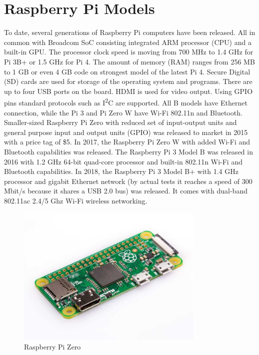 \documentclass[11pt]{article}
\begin{document}
\section{Raspberry Pi Models}
To date, several generations of Raspberry Pi computers have been released.
 All in common with Broadcom SoC consisting integrated ARM processor (CPU)
 and a built-in GPU. The processor clock speed is moving from 700 MHz to 1.4 GHz
 for Pi 3B+ or 1.5 GHz for Pi 4. The amount of memory (RAM) ranges from 256 MB
 to 1 GB or even 4 GB code on strongest model of the latest Pi 4. Secure Digital
 (SD) cards are used for storage of the operating system and programs.
 There are up to four USB ports on the board. HDMI is used for video output.
 Using GPIO pins standard protocols such as I\textsuperscript{2}C are supported.
 All B models have Ethernet connection, while the Pi 3 and Pi Zero W have Wi-Fi
 802.11n and Bluetooth.
\newline
\newline
Smaller-sized Raspberry Pi Zero with reduced set of input-output units and
 general purpose input and output units (GPIO) was released to market in 2015
 with a price tag of \$5. In 2017, the Raspberry Pi Zero W with added Wi-Fi and
 Bluetooth capabilities was released.
The Raspberry Pi 3 Model B was released in 2016 with 1.2 GHz 64-bit quad-core
 processor and built-in 802.11n Wi-Fi and Bluetooth capabilities. In 2018, the
 Raspberry Pi 3 Model B+ with 1.4 GHz processor and gigabit Ethernet
network (by actual tests it reaches a speed of 300 Mbit/s because it shares a
USB 2.0 bus) was released.
 It comes with dual-band 802.11ac 2.4/5 Ghz Wi-Fi wireless networking.
\begin{figure}[h!]
\centering
\includegraphics[width=0.8\textwidth]{rpi-zero.jpg}
\captionsetup{justification=centering}
\caption{Raspberry Pi Zero}
\end{figure}
\end{document}
